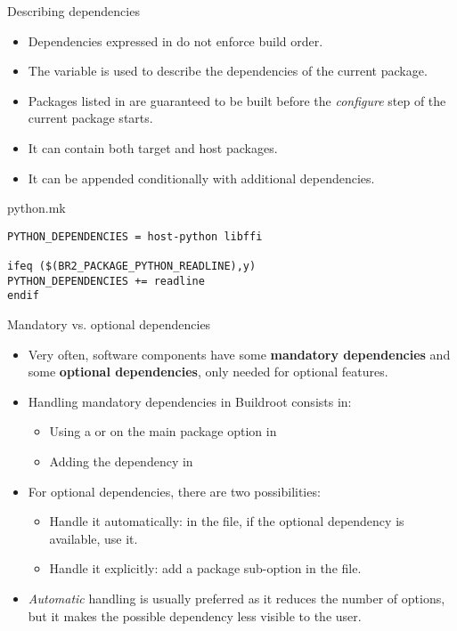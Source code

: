 \begin{frame}[fragile]{Describing dependencies}
  \begin{itemize}
  \item Dependencies expressed in  do not enforce
    build order.
  \item The  variable is used to describe the
    dependencies of the current package.
  \item Packages listed in  are guaranteed to
    be built before the {\em configure} step of the current package
    starts.
  \item It can contain both target and host packages.
  \item It can be appended conditionally with additional dependencies.
  \end{itemize}

  \begin{block}{python.mk}
    \begin{verbatim}
PYTHON_DEPENDENCIES = host-python libffi

ifeq ($(BR2_PACKAGE_PYTHON_READLINE),y)
PYTHON_DEPENDENCIES += readline
endif
    \end{verbatim}
  \end{block}
\end{frame}

\begin{frame}{Mandatory vs. optional dependencies}

  \begin{itemize}
  \item Very often, software components have some {\bf mandatory
      dependencies} and some {\bf optional dependencies}, only needed
    for optional features.
  \item Handling mandatory dependencies in Buildroot consists in:
    \begin{itemize}
    \item Using a  or  on the main
      package option in 
    \item Adding the dependency in 
    \end{itemize}
  \item For optional dependencies, there are two possibilities:
    \begin{itemize}
    \item Handle it automatically: in the  file, if the
      optional dependency is available, use it.
    \item Handle it explicitly: add a package sub-option in the
       file.
    \end{itemize}
  \item {\em Automatic} handling is usually preferred as it reduces
    the number of  options, but it makes the possible
    dependency less visible to the user.
  \end{itemize}
\end{frame}

